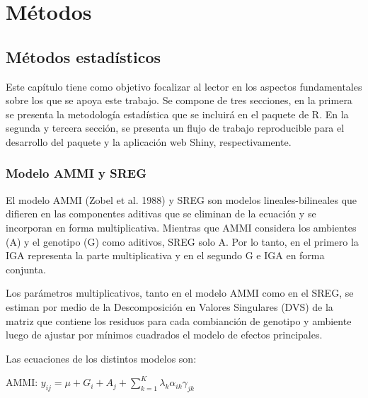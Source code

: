 
\chapter{Métodos}
\section{Métodos estadísticos}

Este capítulo tiene como objetivo focalizar al lector en los aspectos fundamentales sobre los que se apoya este trabajo. Se compone de tres secciones, en la primera se presenta la metodología estadística que se incluirá en el paquete de R.  En la segunda y tercera sección, se presenta un flujo de trabajo reproducible para el desarrollo del paquete y la aplicación web Shiny, respectivamente.



\subsection{Modelo AMMI y SREG}
El modelo AMMI (Zobel et al. 1988) y SREG \citep{Corneliusetal1996, CrossaCornelius1997, CrossaCorneliusYan2002} son modelos lineales-bilineales que difieren en las componentes aditivas que se eliminan de la ecuación y se incorporan en forma multiplicativa. Mientras que AMMI considera los ambientes (A) y el genotipo (G) como aditivos, SREG solo A. Por lo tanto, en el primero la IGA representa la parte multiplicativa y en el segundo G e IGA en forma conjunta. 

Los parámetros multiplicativos, tanto en el modelo AMMI como en el SREG, se estiman por medio de la Descomposición en Valores Singulares (DVS) de la matriz que contiene los residuos para cada combianción de genotipo y ambiente luego de ajustar por mínimos cuadrados el modelo de efectos principales. 

Las ecuaciones de los distintos modelos son:

\hspace{0.5cm} AMMI: $y_{ij}= \mu + G_i + A_j + \sum_{k=1}^K \lambda_k \alpha_{ik} \gamma_{jk}$

